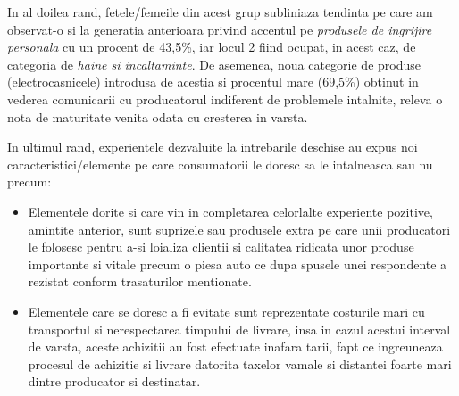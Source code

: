 \documentclass[a4paper, 12pt]{article}
\begin{document}
\begin{itemize}
		\quad In al doilea rand, fetele/femeile din acest grup subliniaza tendinta pe care am observat-o si la generatia anterioara privind accentul pe \textit{produsele de ingrijire personala} cu un procent de 43,5\%, iar locul 2 fiind ocupat, in acest caz, de categoria de \textit{haine si incaltaminte}. De asemenea, noua categorie de produse (electrocasnicele)  introdusa de acestia si procentul mare (69,5\%) obtinut in vederea comunicarii cu producatorul indiferent de problemele intalnite, releva o nota de maturitate venita odata cu cresterea in varsta.
		
		\quad In ultimul rand, experientele dezvaluite la intrebarile deschise au expus noi caracteristici/elemente pe care consumatorii le doresc sa le intalneasca sau nu precum:
		\begin{itemize}
			\item Elementele dorite si care vin in completarea celorlalte experiente pozitive, amintite anterior, sunt suprizele sau produsele extra pe care unii producatori le folosesc pentru a-si loializa clientii si  calitatea ridicata unor produse importante si vitale precum o piesa auto ce dupa spusele unei respondente a rezistat conform trasaturilor mentionate.
			\item Elementele care se doresc a fi evitate sunt reprezentate costurile mari cu transportul si nerespectarea timpului de livrare, insa in cazul acestui interval de varsta, aceste achizitii au fost efectuate inafara tarii, fapt ce ingreuneaza procesul de achizitie si livrare datorita taxelor vamale si distantei foarte mari dintre producator si destinatar.
		\end{itemize}
	\end{itemize}
\newpage	
\end{document}
